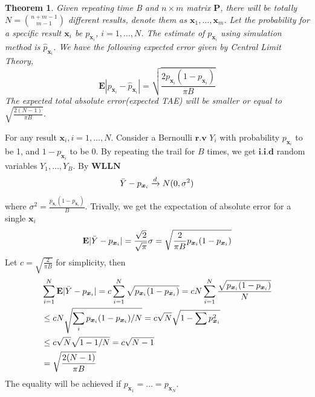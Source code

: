 \documentclass[12pt]{article}
\newcommand{\EE}{\mathbf{E}}
\newtheorem{thm}{Theorem}
\begin{document}
\begin{thm}
Given repeating time \mbox{B} and $n \times m$ matrix $\boldsymbol{P}$, there will be totally  $N=\binom{n+m-1}{m-1}$ different results, denote them as  $\boldsymbol{x}_1,\dots,\boldsymbol{x}_m$. Let the probability for a specific result $\boldsymbol{x}_{i}$ be $p_{\boldsymbol{x}_{i}}$, $i=1,\dots,N$. The estimate of  $p_{\boldsymbol{x}_{i}}$ using simulation method is $\hat{p}_{\boldsymbol{x}_i}$. We have the following expected error given by Central Limit Theory,
\begin{equation*}
    \EE|p_{\boldsymbol{x}_i} - \hat{p}_{\boldsymbol{x}_i}| =  \sqrt{\frac{2 p_{\boldsymbol{x}_i}(1-p_{\boldsymbol{x}_i})}{\pi B}}
\end{equation*}
The expected total absolute error(expected \mbox{TAE}) will be smaller or equal to 
$\sqrt{\frac{2(N-1)}{\pi B}}$.
\end{thm}
For any result $\boldsymbol{x}_i,i=1,\dots,N$. Consider a Bernoulli $\textbf{r.v}$ $Y_i$ with probability $p_{\boldsymbol{x}_i}$ to be 1, and $1-p_{\boldsymbol{x}_i}$ to be 0. By repeating the trail for $B$ times, we get $\textbf{i.i.d}$ random variables $Y_1,\dots,Y_{B}$. By $\textbf{WLLN}$
\begin{equation*}
    \Bar{Y}-p_{\boldsymbol{x}_i} \xrightarrow{d} N(0,\sigma^2)
\end{equation*}
where $\sigma^2 = \frac{p_{\boldsymbol{x}_i}(1-p_{\boldsymbol{x}_i})}{B}$. Trivally, we get the expectation of absolute error for a single $\boldsymbol{x}_i$
\begin{equation*}
    \EE |\Bar{Y}-p_{\boldsymbol{x}_i}| = \frac{\sqrt{2}}{\sqrt{\pi}}\sigma = \sqrt{\frac{2}{\pi B}p_{\boldsymbol{x}_i}(1-p_{\boldsymbol{x}_i})}
\end{equation*}
Let $c = \sqrt{\frac{2}{\pi B}}$ for simplicity, then
\begin{align*}
    & \sum_{i=1}^{N}\EE |\Bar{Y}-p_{\boldsymbol{x}_i}| = c \sum_{i=1}^{N} \sqrt{p_{\boldsymbol{x}_i}(1-p_{\boldsymbol{x}_i})}  = c N \sum_{i=1}^{N}\frac{\sqrt{p_{\boldsymbol{x}_i}(1-p_{\boldsymbol{x}_i})}}{N} \\
    & \leq c N \sqrt{\sum_{i}p_{\boldsymbol{x}_i}(1-p_{\boldsymbol{x}_i})/N} = c \sqrt{N} \sqrt{1-\sum p_{\boldsymbol{x}_{i}}^2}\\ &\leq c \sqrt{N} \sqrt{1-1/N} = c\sqrt{N-1}\\
    & = \sqrt{\frac{2(N-1)}{\pi B}}
\end{align*}
The equality will be achieved if $p_{\boldsymbol{x}_1} = \dots = p_{\boldsymbol{x}_N}$. 
\end{document}
